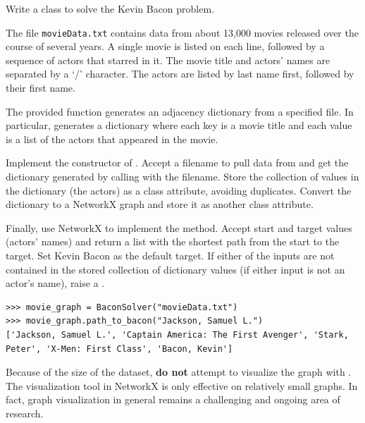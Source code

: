 \begin{problem}
Write a  class to solve the Kevin Bacon problem.

The file \texttt{movieData.txt} contains data from about 13,000 movies released over the course of several years.
A single movie is listed on each line, followed by a sequence of actors that starred in it.
The movie title and actors' names are separated by a `/' character.
The actors are listed by last name first, followed by their first name.

The provided  function generates an adjacency dictionary from a specified file.
In particular,  generates a dictionary where each key is a movie title and each value is a list of the actors that appeared in the movie.

Implement the constructor of .
Accept a filename to pull data from and get the dictionary generated by calling  with the filename.
Store the collection of values in the dictionary (the actors) as a class attribute, avoiding duplicates.
Convert the dictionary to a NetworkX graph and store it as another class attribute.

Finally, use NetworkX to implement the  method.
Accept start and target values (actors' names) and return a list with the shortest path from the start to the target.
Set Kevin Bacon as the default target.
If either of the inputs are not contained in the stored collection of dictionary values (if either input is not an actor's name), raise a .

\begin{lstlisting}
>>> movie_graph = BaconSolver("movieData.txt")
>>> movie_graph.path_to_bacon("Jackson, Samuel L.")
['Jackson, Samuel L.', 'Captain America: The First Avenger', 'Stark,
Peter', 'X-Men: First Class', 'Bacon, Kevin']
\end{lstlisting}

\begin{warn}
Because of the size of the dataset, \textbf{do not} attempt to visualize the graph with .
The visualization tool in NetworkX is only effective on relatively small graphs.
In fact, graph visualization in general remains a challenging and ongoing area of research.
\end{warn}
\end{problem}


